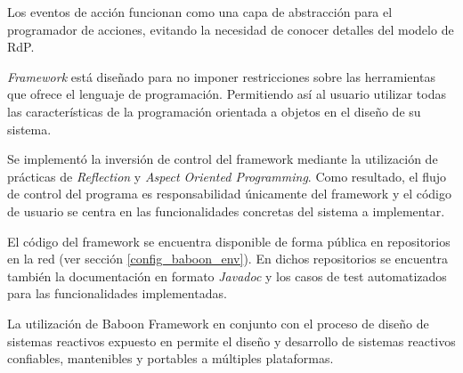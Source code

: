 Los eventos de acción funcionan como una capa de abstracción para el programador
de acciones, evitando la necesidad de conocer detalles del modelo de RdP.

\textit{\nombreFramework Framework} está diseñado para no imponer restricciones
sobre las herramientas que ofrece el lenguaje de programación. Permitiendo así
al usuario utilizar todas las características de la programación orientada a
objetos en el diseño de su sistema.

Se implementó la inversión de control del framework mediante la utilización de
prácticas de \textit{Reflection} y \textit{Aspect Oriented Programming}. Como
resultado, el flujo de control del programa es responsabilidad únicamente del
framework y el código de usuario se centra en las funcionalidades concretas del
sistema a implementar.

El código del framework se encuentra disponible de forma pública en repositorios
en la red (ver sección \ref{config_baboon_env}). En dichos repositorios se
encuentra también la documentación en formato \textit{Javadoc} y los casos de
test automatizados para las funcionalidades implementadas.

La utilización de Baboon Framework en conjunto con el proceso de diseño de
sistemas reactivos expuesto en \cite{Bentivegna-Ludemann} permite el diseño y
desarrollo de sistemas reactivos confiables, mantenibles y portables a
múltiples plataformas.
